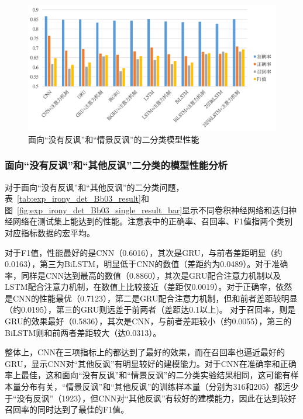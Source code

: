 \begin{figure}[H]
  \centering
  \includegraphics[width=\textwidth]{img/exp_irony_det_Bb02_single_result_bar.png}
  \caption{面向“没有反讽”和“情景反讽”的二分类模型性能}
  \label{fig:exp_irony_det_Bb02_single_result_bar}
\end{figure}

\subsubsection{面向“没有反讽”和“其他反讽”二分类的模型性能分析}
\label{sssec:exp_irony_det_Bb03_base}

对于面向“没有反讽”和“其他反讽”的二分类问题，表~\ref{tab:exp_irony_det_Bb03_result}和图~\ref{fig:exp_irony_det_Bb03_single_result_bar}显示不同卷积神经网络和迭归神经网络在测试集上能达到的性能。注意表中的正确率、召回率、F1值指两个类别对应指标数据的宏平均。

对于F1值，性能最好的是CNN（0.6016），其次是GRU，与前者差距明显（约0.0163），第三为BiLSTM，明显低于CNN的数值（差距约为0.0489）。对于准确率，同样是CNN达到最高的数值（0.8860），其次是GRU配合注意力机制以及LSTM配合注意力机制，在数值上比较接近（差距仅0.0019）。对于正确率，依然是CNN的性能最优（0.7123），第二是GRU配合注意力机制，但和前者差距较明显（约0.0195），第三的GRU则远差于前两者（差距达0.1以上)。 对于召回率，则是GRU的效果最好（0.5836），其次是CNN，与前者差距较小（约0.0055），第三的BiLSTM则和前两者差距较大（达0.0313）。

整体上，CNN在三项指标上的都达到了最好的效果，而在召回率也逼近最好的GRU，显示CNN对“其他反讽”有明显较好的建模能力。对于CNN在准确率和正确率上最佳，这和面向“没有反讽”和“情景反讽”的二分类实验结果相同，这可能有样本量分布有关，“情景反讽”和“其他反讽”的训练样本量（分别为316和205）都远少于“没有反讽”（1923），但CNN对“其他反讽”有较好的建模能力，因此在达到较好召回率的同时达到了最佳的F1值。

